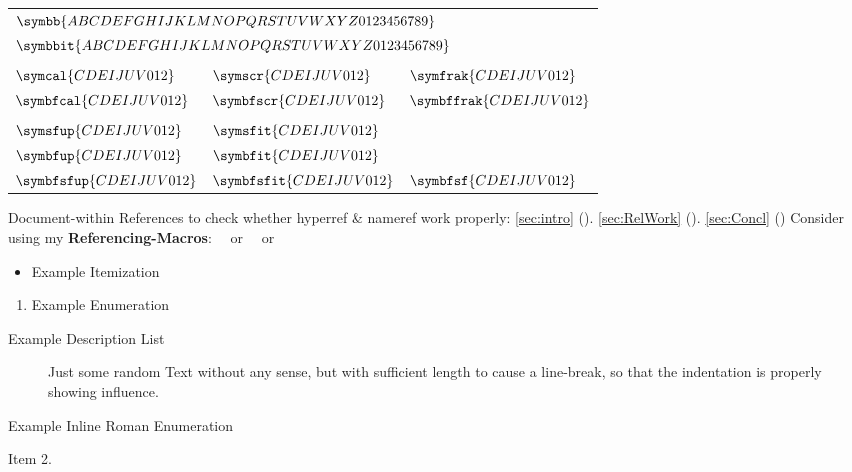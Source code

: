 \renewcommand{\showcaseMathString}{CDEIJUV 012}%
\begin{tabular}{lll}%
	\multicolumn{3}{l}{$\symbb{ABCDEFGHIJKLMNOPQRSTUVWXYZ 0123456789}$}\\
	\multicolumn{3}{l}{$\symbbit{ABCDEFGHIJKLMNOPQRSTUVWXYZ 0123456789}$}\\
	&&\\
	$\symcal{\showcaseMathString}$&$\symscr{\showcaseMathString}$&$\symfrak{\showcaseMathString}$\\
	$\symbfcal{\showcaseMathString}$&$\symbfscr{\showcaseMathString}$&$\symbffrak{\showcaseMathString}$\\
	&&\\
	$\symsfup{\showcaseMathString}$&$\symsfit{\showcaseMathString}$&\\
	$\symbfup{\showcaseMathString}$&$\symbfit{\showcaseMathString}$&\\
	$\symbfsfup{\showcaseMathString}$&$\symbfsfit{\showcaseMathString}$&$\symbfsf{\showcaseMathString}$\\
\end{tabular}


\npi%
Document-within References to check whether hyperref \& nameref work properly:\nl%
\ref{sec:intro} (). \ref{sec:RelWork}  (). \ref{sec:Concl} ()\nl%
Consider using my \textbf{Referencing-Macros}:\nl
{}\nl
\ \ or \nl
\ \ or 

\npi%
\begin{itemize}
\item%
	Example Itemization
\end{itemize}
\begin{enumerate}
\item%
	Example Enumeration
\end{enumerate}
\begin{description}
\item[Example Description List]%
	Just some random Text without any sense, but with sufficient length to cause a line-break, so that the indentation is properly showing influence.
\end{description}
\begin{enuminlrom}
\item%
	Example Inline Roman Enumeration
\item%
	Item 2.
\end{enuminlrom}

\npi%
{%
	\LARGE%
	\contourlength{\DenKrOutlineWidth}%
	\nl%
	{%
		\contourlength{0.2em}%
		\nl%
		\nl%
	}%
	\nl%
}%


